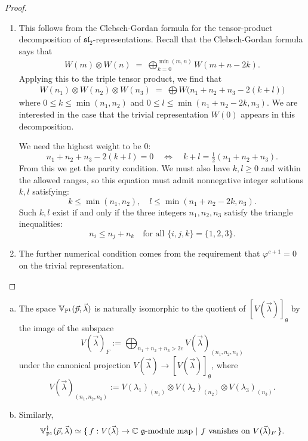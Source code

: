 \documentclass[12pt]{article}
\begin{document}
\begin{proof}
    \leavevmode
    \begin{enumerate}
        \item This follows from the Clebsch-Gordan formula for the tensor-product decomposition of $\mathfrak{sl}_2$-representations. Recall that the Clebsch-Gordan formula says that \begin{align*}
                  W(m)\otimes W(n) \;=\;\bigoplus_{k=0}^{\min(m,n)} W(m+n-2k). \end{align*} Applying this to the triple tensor product, we find that \begin{align*}
                  W(n_1)\otimes W(n_2)\otimes W(n_3)
                  \;=\;
                  \bigoplus W\bigl(n_1+n_2+n_3-2(k+l)\bigr)
            \end{align*} where $0\le k\le\min(n_1,n_2)$ and $0\le l\le\min(n_1+n_2-2k,n_3)$. We are interested in the case that the trivial representation $W(0)$ appears in this decomposition.

            We need the highest weight to be 0:
            \[
            n_1+n_2+n_3-2(k+l)=0
            \quad\Longleftrightarrow\quad
            k+l = \tfrac{1}{2}(n_1+n_2+n_3).
            \]
From this we get the parity condition. We must also have $k,l\ge0$ and within the allowed ranges, so this equation must admit nonnegative integer solutions $k,l$ satisfying:
            \[
            k\le\min(n_1,n_2), \quad l\le\min(n_1+n_2-2k,n_3).
            \]
            Such $k,l$ exist if and only if the three integers $n_1,n_2,n_3$ satisfy the triangle inequalities:
            \[
            n_i \le n_j + n_k \quad\text{for all } \{i,j,k\}=\{1,2,3\}.
            \]
        \item The further numerical condition comes from the requirement that $\varphi^{c+1}=0$ on the trivial representation. \qedhere
    \end{enumerate}
\end{proof}

\begin{corollary}
\begin{enumerate}[(a)]
\item
The space $\mathbb V_{\P^1}(\vec p,\vec\lambda)$ is naturally isomorphic to the quotient of $[V(\vec\lambda)]_{\mathfrak g}$ by the image of the subspace
\[
V(\vec\lambda)_F
:=\bigoplus_{n_1+n_2+n_3>2c}V(\vec\lambda)_{(n_1,n_2,n_3)}
\]
under the canonical projection
$V(\vec\lambda)\to[V(\vec\lambda)]_{\mathfrak g}$,
where
\[
V(\vec\lambda)_{(n_1,n_2,n_3)}:=
V(\lambda_1)_{(n_1)}\otimes V(\lambda_2)_{(n_2)}\otimes V(\lambda_3)_{(n_3)}.
\]

\item
Similarly,
\[
\mathbb V_{\P^1}^\dagger(\vec p,\vec\lambda)
\simeq
\{\,f:V(\vec\lambda)\to\C\text{ $\mathfrak g$-module map }|\ f\text{ vanishes on }V(\vec\lambda)_F\,\}.
\]
\end{enumerate}
\end{corollary}
\end{document}
